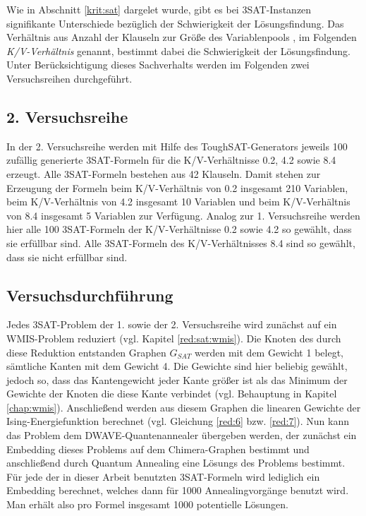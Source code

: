 \documentclass[runningheads]{llncs}
\begin{document}
Wie in Abschnitt \ref{krit:sat} dargelet wurde, gibt es bei 3SAT-Instanzen signifikante Unterschiede bezüglich der Schwierigkeit der Lösungsfindung. Das Verhältnis aus Anzahl der Klauseln zur Größe des Variablenpools , im Folgenden \emph{K/V-Verhältnis} genannt, bestimmt dabei die Schwierigkeit der Lösungsfindung. Unter Berücksichtigung dieses Sachverhalts werden im Folgenden zwei Versuchsreihen durchgeführt.
\subsection{2. Versuchsreihe}
In der 2. Versuchsreihe werden mit Hilfe des ToughSAT-Generators jeweils 100 zufällig generierte 3SAT-Formeln für die K/V-Verhältnisse 0.2, 4.2 sowie 8.4 erzeugt. Alle 3SAT-Formeln bestehen aus 42 Klauseln. Damit stehen zur Erzeugung der Formeln beim  K/V-Verhältnis von 0.2 insgesamt 210 Variablen, beim K/V-Verhältnis von 4.2 insgesamt 10 Variablen und beim K/V-Verhältnis von 8.4 insgesamt 5 Variablen zur Verfügung. Analog zur 1. Versuchsreihe werden hier alle 100 3SAT-Formeln der K/V-Verhältnisse 0.2 sowie 4.2 so gewählt, dass sie erfüllbar sind. Alle 3SAT-Formeln des K/V-Verhältnisses 8.4 sind so gewählt, dass sie nicht erfüllbar sind.
\subsection{Versuchsdurchführung}
Jedes 3SAT-Problem der 1. sowie der 2. Versuchsreihe wird zunächst auf ein WMIS-Problem reduziert (vgl. Kapitel \ref{red:sat:wmis}). Die Knoten des durch diese Reduktion entstanden Graphen \emph{$G_{SAT}$} werden mit dem  Gewicht 1 belegt, sämtliche Kanten mit dem Gewicht 4. Die Gewichte sind hier beliebig gewählt, jedoch so, dass das Kantengewicht jeder Kante größer ist als das Minimum der Gewichte der Knoten die diese Kante verbindet (vgl. Behauptung in Kapitel \ref{chap:wmis}). Anschließend werden aus diesem Graphen die linearen Gewichte der Ising-Energiefunktion berechnet (vgl. Gleichung \ref{red:6} bzw. \ref{red:7}). Nun kann das Problem dem DWAVE-Quantenannealer übergeben werden, der zunächst ein Embedding dieses Problems auf dem Chimera-Graphen bestimmt und anschließend durch Quantum Annealing eine Lösungs des Problems bestimmt. Für jede der in dieser Arbeit benutzten 3SAT-Formeln wird lediglich ein Embedding berechnet, welches dann für 1000 Annealingvorgänge benutzt wird. Man erhält also pro Formel insgesamt 1000 potentielle Lösungen.

\end{document}
